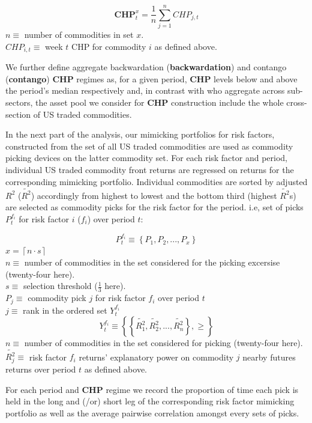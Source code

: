\documentclass[12pt,]{article}
\begin{document}
\[\mathbf{CHP}_{t}^{x}=\frac{1}{n}\sum_{j=1}^{n}CHP_{j,t}\] \(n\equiv\)
number of commodities in set \(x\).\\
\(CHP_{i,t}\equiv\) week \(t\) CHP for commodity \(i\) as defined above.

We further define aggregate backwardation (\textbf{backwardation}) and
contango (\textbf{contango}) \textbf{CHP} regimes as, for a given
period, \textbf{CHP} levels below and above the period's median
respectively and, in contrast with \citep{hong_what_2012} who aggregate
across sub-sectors, the asset pool we consider for \textbf{CHP}
construction include the whole cross-section of US traded commodities.

In the next part of the analysis, our mimicking portfolios for risk
factors, constructed from the set of all US traded commodities are used
as commodity picking devices on the latter commodity set. For each risk
factor and period, individual US traded commodity front returns are
regressed on returns for the corresponding mimicking portfolio.
Individual commodities are sorted by adjusted \(R^{2}\)
(\(\tilde{R^{2}}\)) accordingly from highest to lowest and the bottom
third (highest \(\tilde{R^{2}}\)s) are selected as commodity picks for
the risk factor for the period. i.e, set of picks \(P_{t}^{f_{i}}\) for
risk factor \(i\) (\(f_{i}\)) over period \(t\):

\[P_{t}^{f_{i}}\equiv\left \{ P_{1}, P_{2}, ..., P_{x} \right \}\]
\(x = \left \lceil n \cdot s \right \rceil\)\\
\(n\equiv\) number of commodities in the set considered for the picking
excersise (twenty-four here).\\
\(s\equiv\) selection threshold (\(\frac{1}{3}\) here).\\
\(P_{j}\equiv\) commodity pick \(j\) for risk factor \(f_{i}\) over
period \(t\)\\
\(j\equiv\) rank in the ordered set \(Y_{t}^{f_{i}}\)\\
\[Y_{t}^{f_{i}}\equiv\left \{ \left \{ \tilde{R_{1}^{2}}, \tilde{R_{2}^{2}}, ..., \tilde{R_{n}^{2}} \right \}, \geq \right \}\]
\(n\equiv\) number of commodities in the set considered for picking
(twenty-four here).\\
\(\tilde{R_{j}^{2}}\equiv\) risk factor \(f_{i}\) returns' explanatory
power on commodity \(j\) nearby futures returns over period \(t\) as
defined above.

For each period and \textbf{CHP} regime we record the proportion of time
each pick is held in the long and (/or) short leg of the corresponding
risk factor mimicking portfolio as well as the average pairwise
correlation amongst every sets of picks.
\end{document}
